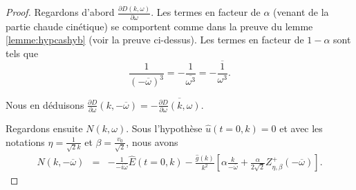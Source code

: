 \begin{proof}
Regardons d'abord $\frac{\partial D(k,\omega)}{\partial\omega}$. Les termes en facteur de $\alpha$ (venant de la partie chaude cinétique) se comportent comme dans la preuve du lemme \ref{lemme:hypcashyb} (voir la preuve ci-dessus). Les termes en facteur de $1-\alpha$ sont tels que
$$\frac{1}{(-\overline{\omega})^3}=-\frac{1}{\overline{\omega^3}}=-\overline{\frac{1}{\omega^3}}.$$

Nous en déduisons $\frac{\partial D}{\partial \omega}(k,-\overline{\omega})=-\overline{\frac{\partial D}{\partial \omega}(k,\omega)}$.

Regardons ensuite $N(k,\omega)$. Sous l'hypothèse $\hat{u}(t=0,k)=0$ et avec les notations $\eta=\frac{1}{\sqrt{2}k}$ et $\beta=\frac{v_0}{\sqrt{2}}$, nous avons
\begin{eqnarray*}
N(k,-\overline{\omega})&=&-\frac{1}{-i\overline{\omega}}\hat{E}(t=0,k)-\frac{\hat{g}(k)}{ k^2}\left[\alpha\frac{k}{-\overline{\omega}}+\frac{\alpha}{2\sqrt{2}}Z_{\eta,\beta}^+\left(-\overline{\omega}\right)\right].
\end{eqnarray*}

\end{proof}

